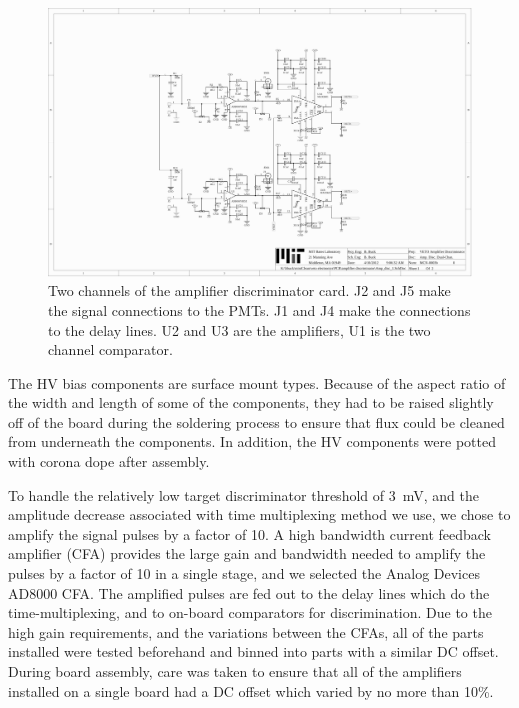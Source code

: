 \documentclass[review,number,sort&compress]{elsarticle}
\begin{document}
\begin{figure}[ht]
\begin{center}
\includegraphics[width=5.5in, keepaspectratio=true, trim=4.54in 2.12in 4.54in 2.12in, clip=true]{graphics/veto_sch.pdf}
\caption{Two channels of the amplifier discriminator card. J2 and J5 make the signal connections to the PMTs. J1 and J4 make the connections to the delay lines. U2 and U3 are the amplifiers, U1 is the two channel comparator.
\label{fig:ampdiscsch}}
\end{center}
\end{figure}

The HV bias components are surface mount types. Because of the aspect
ratio of the width and length of some of the components, they had to
be raised slightly off of the board during the soldering process to
ensure that flux could be cleaned from underneath the components. In
addition, the HV components were potted with corona dope after
assembly.

To handle the relatively low target discriminator threshold of 3~mV,
and the amplitude decrease associated with time multiplexing method we
use, we chose to amplify the signal pulses by a factor of 10.  A high
bandwidth current feedback amplifier (CFA) provides the large gain and
bandwidth needed to amplify the pulses by a factor of 10 in a single
stage, and we selected the Analog Devices AD8000 CFA. The amplified
pulses are fed out to the delay lines which do the time-multiplexing,
and to on-board comparators for discrimination.  Due to the high gain
requirements, and the variations between the CFAs, all of the parts
installed were tested beforehand and binned into parts with a similar
DC offset.  During board assembly, care was taken to ensure that all
of the amplifiers installed on a single board had a DC offset which
varied by no more than 10\%.
\end{document}
